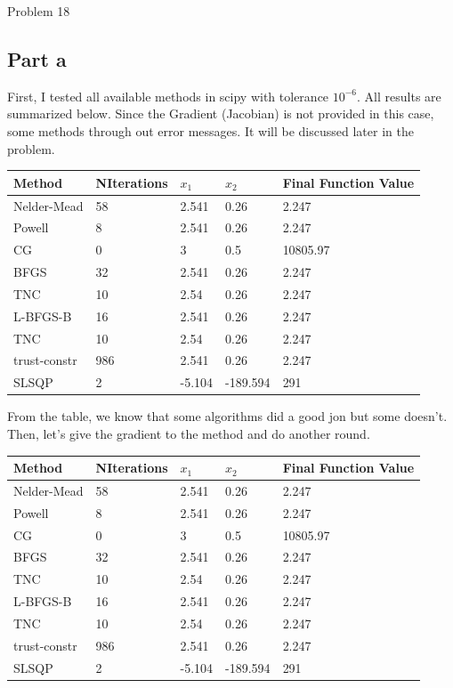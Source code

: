 \documentclass[12pt]{article}
\begin{document}
\begin{section}{Problem 18}
	\subsection{Part a}
	First, I tested all available methods in scipy with tolerance $10^{-6}$. All results are summarized below. Since the Gradient (Jacobian) is not provided in this case, some methods through out error messages. It will be discussed later in the problem. 
	
	\begin{table}[]
		\begin{tabular}{lllll}
			\hline
			Method & NIterations & $x_1$ & $x_2$& Final Function Value \\
			\hline\hline
			Nelder-Mead  & 58  & 2.541  & 0.26     & 2.247    \\
			Powell       & 8   & 2.541  & 0.26     & 2.247    \\
			CG           & 0   & 3      & 0.5      & 10805.97 \\
			BFGS         & 32  & 2.541  & 0.26     & 2.247    \\
			TNC          & 10  & 2.54   & 0.26     & 2.247    \\
			L-BFGS-B     & 16  & 2.541  & 0.26     & 2.247    \\
			TNC          & 10  & 2.54   & 0.26     & 2.247    \\
			trust-constr & 986 & 2.541  & 0.26     & 2.247    \\
			SLSQP        & 2   & -5.104 & -189.594 & 291     
		\end{tabular}
	\end{table}
    
    From the table, we know that some algorithms did a good jon but some doesn't. Then, let's give the gradient to the method and do another round. 
    
    	\begin{table}[]
    	\begin{tabular}{lllll}
    		\hline
    		Method & NIterations & $x_1$ & $x_2$& Final Function Value \\
    		\hline\hline
    		Nelder-Mead  & 58  & 2.541  & 0.26     & 2.247    \\
    		Powell       & 8   & 2.541  & 0.26     & 2.247    \\
    		CG           & 0   & 3      & 0.5      & 10805.97 \\
    		BFGS         & 32  & 2.541  & 0.26     & 2.247    \\
    		TNC          & 10  & 2.54   & 0.26     & 2.247    \\
    		L-BFGS-B     & 16  & 2.541  & 0.26     & 2.247    \\
    		TNC          & 10  & 2.54   & 0.26     & 2.247    \\
    		trust-constr & 986 & 2.541  & 0.26     & 2.247    \\
    		SLSQP        & 2   & -5.104 & -189.594 & 291     
    	\end{tabular}
    \end{table}


\end{section}
\end{document}
